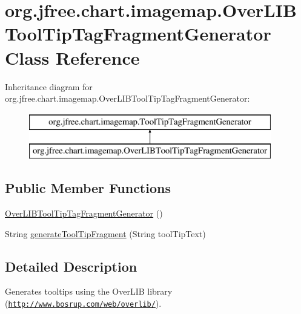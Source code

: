 \hypertarget{classorg_1_1jfree_1_1chart_1_1imagemap_1_1_over_l_i_b_tool_tip_tag_fragment_generator}{}\section{org.\+jfree.\+chart.\+imagemap.\+Over\+L\+I\+B\+Tool\+Tip\+Tag\+Fragment\+Generator Class Reference}
\label{classorg_1_1jfree_1_1chart_1_1imagemap_1_1_over_l_i_b_tool_tip_tag_fragment_generator}
Inheritance diagram for org.\+jfree.\+chart.\+imagemap.\+Over\+L\+I\+B\+Tool\+Tip\+Tag\+Fragment\+Generator\+:\begin{figure}[H]
\begin{center}
\leavevmode
\includegraphics[height=2.000000cm]{classorg_1_1jfree_1_1chart_1_1imagemap_1_1_over_l_i_b_tool_tip_tag_fragment_generator}
\end{center}
\end{figure}
\subsection*{Public Member Functions}
\begin{DoxyCompactItemize}
\item 
\mbox{\hyperlink{classorg_1_1jfree_1_1chart_1_1imagemap_1_1_over_l_i_b_tool_tip_tag_fragment_generator_ab4bb6643b8b28cb7c11172195de9b60b}{Over\+L\+I\+B\+Tool\+Tip\+Tag\+Fragment\+Generator}} ()
\item 
String \mbox{\hyperlink{classorg_1_1jfree_1_1chart_1_1imagemap_1_1_over_l_i_b_tool_tip_tag_fragment_generator_a235eb74d643d63a99bd7dfb830a03426}{generate\+Tool\+Tip\+Fragment}} (String tool\+Tip\+Text)
\end{DoxyCompactItemize}


\subsection{Detailed Description}
Generates tooltips using the Over\+L\+IB library (\href{http://www.bosrup.com/web/overlib/}{\tt http\+://www.\+bosrup.\+com/web/overlib/}). 

